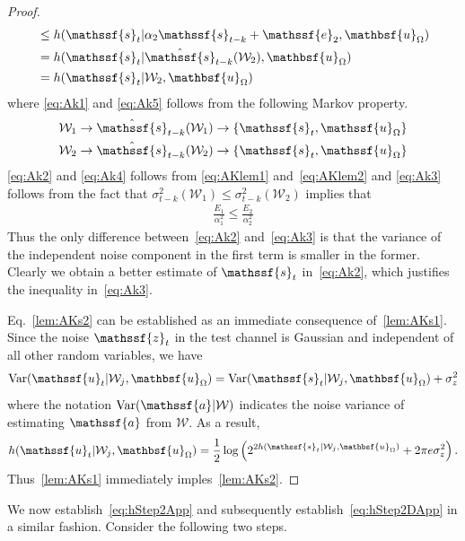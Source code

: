 \documentclass[journal, twocolumn, 10pt]{IEEEtran}
\newcommand{\cW}{{\mathcal{W}}}
\newcommand{\rva}{{\mathssf{a}}}    %
\newcommand{\rve}{{\mathssf{e}}}    %
\newcommand{\rvs}{{\mathssf{s}}}    %
\newcommand{\rvu}{{\mathssf{u}}}    %
\newcommand{\rvbu}{{\mathbsf{u}}}
\newcommand{\rvz}{{\mathssf{z}}}    %
\begin{document}
{\begin{proof}
\begin{align}
 & \le h(\rvs_{t} | \alpha_2 \rvs_{t-k} +\rve_2, \rvbu_{\Omega}) \label{eq:Ak3}\\
 &= h(\rvs_{t} | \hat{\rvs}_{t-k}(\cW_2), \rvbu_{\Omega})\label{eq:Ak4}\\
 &= h(\rvs_{t} | \cW_2, \rvbu_{\Omega})\label{eq:Ak5}
\end{align} where \eqref{eq:Ak1} and \eqref{eq:Ak5} follows from the following Markov property. 
\begin{align}
&\cW_1 \rightarrow \hat{\rvs}_{t-k}(\cW_{1}) \rightarrow \{\rvs_{t}, \rvu_{\Omega}\}\\
&\cW_2 \rightarrow \hat{\rvs}_{t-k}(\cW_{2}) \rightarrow \{\rvs_{t}, \rvu_{\Omega}\}
\end{align} \eqref{eq:Ak2} and \eqref{eq:Ak4} follows from \eqref{eq:AKlem1} and~\eqref{eq:AKlem2} and \eqref{eq:Ak3} follows from the fact that  $\sigma^2_{t-k}(\cW_1)\le \sigma^2_{t-k}(\cW_2)$ implies that 
\begin{align}
\frac{E_1}{\alpha^2_{1}} \le \frac{E_2}{\alpha^2_{2}}
\end{align} Thus the only difference between~\eqref{eq:Ak2} and~\eqref{eq:Ak3} is that the variance of the independent noise component in the first term is smaller in the former. Clearly we obtain a better estimate of $\rvs_t$ in~\eqref{eq:Ak2}, which justifies the inequality in~\eqref{eq:Ak3}.

Eq.~\eqref{lem:AKs2} can be established as an immediate consequence of~\eqref{lem:AKs1}.
Since the noise $\rvz_{t}$ in the test channel is Gaussian and independent of all other random variables, we have
\begin{align}
\textrm{Var}(\rvu_{t}|\cW_j, \rvbu_{\Omega} ) = \textrm{Var}(\rvs_{t}|\cW_j, \rvbu_{\Omega} ) + \sigma^2_{z}
\end{align} where the notation $\textrm{Var}(\rva|\mathcal{W})$ indicates the noise variance of estimating $\rva$ from $\mathcal{W}$. As a result, 
\begin{align}
h(\rvu_{t} | \cW_j, \rvbu_{\Omega} ) = \frac{1}{2} \log\left(2^{2h(\rvs_{t}|\cW_j, \rvbu_{\Omega} )}+ 2 \pi e \sigma^2_{z}\right). \label{eq:Ak6}
\end{align} Thus~\eqref{lem:AKs1} immediately imples~\eqref{lem:AKs2}. 
\end{proof} 

We now establish~\eqref{eq:hStep2App} and subsequently establish~\eqref{eq:hStep2DApp} in a similar fashion. Consider the following two steps. 

}
\end{document}
